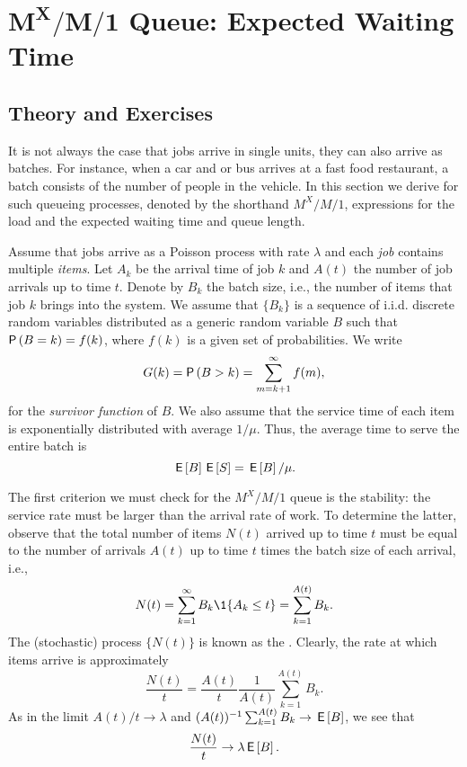 \section
[$M^X/M/1$ Queue: Expected Waiting Time]
{$\mathbf{M^X/M/1}$ Queue: Expected Waiting Time}
\label{sec:mxm1-queue:-expected}

\subsection*{Theory and Exercises}


It is not always the case that jobs arrive in single units, they can
also arrive as batches. For instance, when a car and or bus arrives at a fast
food restaurant, a batch consists of the number of people in the vehicle.  In this section we derive for such queueing processes, denoted by the shorthand $M^X/M/1$, expressions for the load and the expected waiting time and queue length. 


Assume that jobs arrive as a Poisson process with rate $\lambda$ and
each \emph{job} contains multiple \emph{items}.  Let $A_k$ be the
arrival time of job $k$ and $A(t)$ the number of job arrivals up to
time $t$. Denote by $B_k$ the batch size, i.e., the number of items that job $k$ brings into
the system.  We assume that $\{B_k\}$ is a sequence of
i.i.d. discrete random variables distributed as a generic random variable $B$
such that $\P{B = k} = f(k)$, where $f(k)$ is a given set of
probabilities.  We write
\begin{equation*}
  G(k) = \P{B>k} = \sum_{m=k+1}^\infty f(m),
\end{equation*}
for the \emph{survivor function} of $B$.  We also assume that the
service time of each item is exponentially distributed with average
$1/\mu$. Thus, the average time to serve the entire batch is
\begin{equation*}
\,\mathsf{E}\left[B\right]\,\mathsf{E}\left[S\right]=\,\mathsf{E}\left[B\right]/\mu.
\end{equation*}



The first criterion we must check for the $M^X/M/1$ queue is the
stability: the service rate must be larger than the arrival rate of
work. To determine the latter, observe that the total number of items $N(t)$
arrived up to time $t$ must be equal to the number of arrivals $A(t)$
up to time $t$ times the batch size of each arrival, i.e.,
\begin{equation*}
N(t)=  \sum_{k=1}^\infty B_k \1{A_k \leq t} = \sum_{k=1}^{A(t)} B_k.
\end{equation*}
The (stochastic) process $\{N(t)\}$ is known as the . Clearly, the rate at which items arrive is
approximately
\begin{equation*}
  \frac{N(t)}t = \frac{A(t)}t \frac1{A(t)}\sum_{k=1}^{A(t)} B_k.
\end{equation*}
As in  the limit $A(t)/t \to \lambda$ and $(A(t))^{-1}\sum_{k=1}^{A(t)} B_k \to \,\mathsf{E}\left[B\right]$, we see that
\begin{align*}
\frac{N(t)}t \to \lambda \,\mathsf{E}\left[B\right].
\end{align*}

